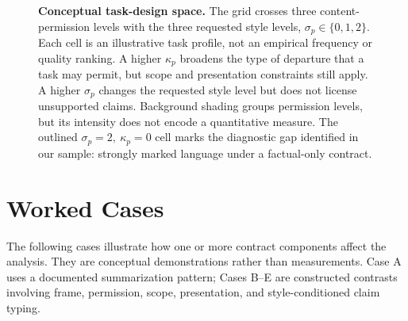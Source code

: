 \documentclass{clv2025}
\begin{document}
\begin{figure}[t]
{}
\caption{\textbf{Conceptual task-design space.}
The grid crosses three content-permission levels with the three requested style levels, $\sigma_p\in\{0,1,2\}$.
Each cell is an illustrative task profile, not an empirical frequency or quality ranking.
A higher $\kappa_p$ broadens the type of departure that a task may permit, but scope and presentation constraints still apply.
A higher $\sigma_p$ changes the requested style level but does not license unsupported claims.
Background shading groups permission levels, but its intensity does not encode a quantitative measure.
The outlined $\sigma_p=2,\ \kappa_p=0$ cell marks the diagnostic gap identified in our sample: strongly marked language under a factual-only contract.}
\label{fig:profiles}
\end{figure}

\section{Worked Cases}\label{sec:cases}

The following cases illustrate how one or more contract components affect the analysis.
They are conceptual demonstrations rather than measurements.
Case A uses a documented summarization pattern; Cases B--E are constructed contrasts involving frame, permission, scope, presentation, and style-conditioned claim typing.
\end{document}
